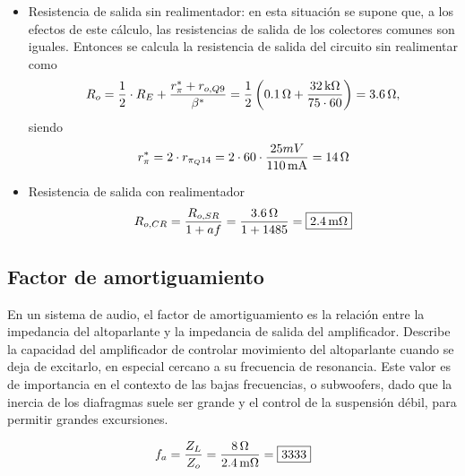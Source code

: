 \begin{itemize}
	\item Resistencia de salida sin realimentador: en esta situación se supone que, a los efectos de este cálculo, las resistencias de salida de los colectores comunes son iguales.
Entonces se calcula la resistencia de salida del circuito sin realimentar como
	\begin{equation}
		\centering
		R_o = \frac{1}{2} \cdot R_E + \frac{ r_{\pi}^{*} + r_{o,Q9} }{\beta^{*} } = \frac{1}{2} \left ( \SI{0.1}{\ohm} + \frac{\SI{32}{\kilo\ohm}}{75 \cdot 60} \right) = \SI{3.6}{\ohm},
	\end{equation}
	siendo
	\begin{equation}
		\centering
		r_{\pi}^{*} = 2 \cdot r_{\pi_Q14} = 2 \cdot 60 \cdot \frac{25mV}{ \SI{110}{\milli\ampere}} = \SI{14}{\ohm} 
	\end{equation}
		
		
	\item Resistencia de salida con realimentador
	\begin{equation}
		\centering
		R_{o,CR} = \frac{R_{o,SR}}{1+ af} = \frac{ \SI{3.6}{\ohm} }{1+1485} = \boxed{\SI{2.4}{\milli\ohm}} 
	\end{equation}
\end{itemize}

\subsection{Factor de amortiguamiento}

En un sistema de audio, el factor de amortiguamiento es la relación entre la impedancia del altoparlante y la impedancia de salida del amplificador. Describe la capacidad del amplificador de controlar movimiento del altoparlante cuando se deja de excitarlo, en especial cercano a su frecuencia de resonancia. Este valor es de importancia en el contexto de las bajas frecuencias, o subwoofers, dado que la inercia de los diafragmas suele ser grande y el control de la suspensión débil, para permitir grandes excursiones.

\begin{equation}
	\centering
	f_a= \frac{Z_L}{Z_o} = \frac{ \SI{8}{\ohm}}{ \SI{2.4}{\milli\ohm}}= \boxed{\num{3333}}
	\label{ec:fa}
\end{equation}



	
	






